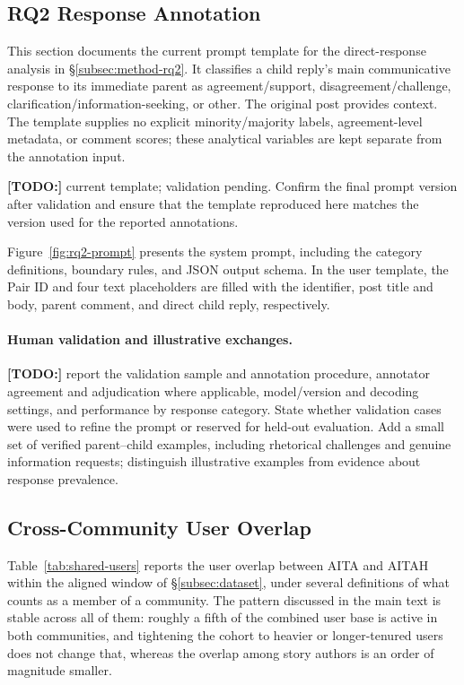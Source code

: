 \subsection{RQ2 Response Annotation}
\label{sec:appendix-rq2-annotation}

This section documents the current prompt template for the direct-response
analysis in \S\ref{subsec:method-rq2}. It classifies a child reply's main
communicative response to its immediate parent as agreement/support,
disagreement/challenge, clarification/information-seeking, or other.
The original post provides context. The template supplies no explicit
minority/majority labels, agreement-level metadata, or comment scores;
these analytical variables are kept separate from the annotation input.

\textbf{[TODO:]} current template; validation pending. Confirm the final prompt
version after validation and ensure that the template reproduced here matches
the version used for the reported annotations.

Figure~\ref{fig:rq2-prompt} presents the system prompt, including the category
definitions, boundary rules, and JSON output schema. In the user template, the Pair ID and four text
placeholders are filled with the identifier, post title and body, parent
comment, and direct child reply, respectively.



\paragraph{Human validation and illustrative exchanges.}
\textbf{[TODO:]} report the validation sample and annotation procedure, annotator
agreement and adjudication where applicable, model/version and decoding
settings, and performance by response category. State whether validation cases
were used to refine the prompt or reserved for held-out evaluation. Add a small
set of verified parent--child examples, including rhetorical challenges and
genuine information requests; distinguish illustrative examples from evidence
about response prevalence.


\subsection{Cross-Community User Overlap}
\label{sec:appendix-overlap}

Table~\ref{tab:shared-users} reports the user overlap between AITA and AITAH
within the aligned window of \S\ref{subsec:dataset}, under several definitions
of what counts as a member of a community. The pattern discussed in the main
text is stable across all of them: roughly a fifth of the combined user base is
active in both communities, and tightening the cohort to heavier or
longer-tenured users does not change that, whereas the overlap among story
authors is an order of magnitude smaller.

